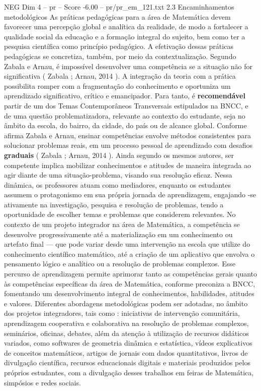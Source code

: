 \begin{textsample}{NEG Dim 4 – pr – Score -6.00 – pr/pr\_em\_121.txt}  \label{ex:f4_neg_101}
2.3 Encaminhamentos metodológicos As práticas pedagógicas para a área de Matemática devem favorecer uma percepção global e analítica da realidade, de modo a fortalecer a qualidade social da educação e a formação integral do sujeito, bem como ter a pesquisa científica como princípio pedagógico.
A efetivação dessas práticas pedagógicas se concretiza, também, por meio da contextualização.
Segundo Zabala e Arnau, é impossível desenvolver uma competência se a situação não for significativa ( Zabala ; Arnau, 2014 ).
A integração da teoria com a prática possibilita romper com a fragmentação do conhecimento e oportuniza um aprendizado significativo, crítico e emancipador.
Para tanto, é \textbf{recomendável} partir de um dos Temas Contemporâneos Transversais estipulados na BNCC, e de uma questão problematizadora, relevante ao contexto do estudante, seja no âmbito da escola, do bairro, da cidade, do país ou de alcance global.
Conforme afirma Zabala e Arnau, ensinar competências envolve métodos consistentes para solucionar problemas reais, em um processo pessoal de aprendizado com desafios \textbf{graduais} ( Zabala ; Arnau, 2014 ).
Ainda segundo os mesmos autores, ser competente implica mobilizar conhecimentos e atitudes de maneira integrada ao agir diante de uma situação-problema, visando sua resolução eficaz.
Nessa dinâmica, os professores atuam como mediadores, enquanto os estudantes assumem o protagonismo em sua própria jornada de aprendizagem, engajando -se ativamente na investigação, pesquisa e resolução de problemas, tendo a oportunidade de escolher temas e problemas que considerem relevantes.
No contexto de um projeto integrador na área de Matemática, a competência se desenvolve progressivamente até a materialização em um conhecimento ou artefato final — que pode variar desde uma intervenção na escola que utilize do conhecimento científico matemático, até a criação de um aplicativo que envolva o pensamento lógico e analítico ou a resolução de problemas complexos.
Esse percurso de aprendizagem permite aprimorar tanto as competências gerais quanto às competências específicas da área de Matemática, conforme preconiza a BNCC, fomentando um desenvolvimento integral de conhecimentos, habilidades, atitudes e valores.
Diferentes abordagens metodológicas podem ser adotadas, no âmbito dos projetos integradores, tais como : iniciativas de intervenção comunitária, aprendizagem cooperativa e colaborativa na resolução de problemas complexos, seminários, oficinas, debates, além da atenção à utilização de recursos didáticos variados, como softwares de geometria dinâmica e estatística, vídeos explicativos de conceitos matemáticos, artigos de jornais com dados quantitativos, livros de divulgação científica, recursos educacionais digitais e materiais produzidos pelos próprios estudantes, com a divulgação desses trabalhos em feiras de Matemática, simpósios e redes sociais.

\end{textsample}
